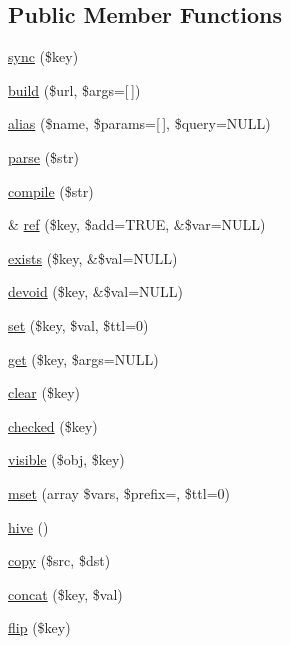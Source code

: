 \subsection*{Public Member Functions}
\begin{DoxyCompactItemize}
\item 
\hyperlink{class_base_aada982ed0466e5ed14d4fcbe22c61840}{sync} (\$key)
\item 
\hyperlink{class_base_a9f2a5290b60008d473e1c9e38f1465d0}{build} (\$url, \$args=\mbox{[}$\,$\mbox{]})
\item 
\hyperlink{class_base_a222997c88655e69eb1bb3a18147ddc3d}{alias} (\$name, \$params=\mbox{[}$\,$\mbox{]}, \$query=N\+U\+LL)
\item 
\hyperlink{class_base_a4d0e49aacf195439c437277b22a81062}{parse} (\$str)
\item 
\hyperlink{class_base_af206a5f3197cfe2acbbb071ec086b710}{compile} (\$str)
\item 
\& \hyperlink{class_base_aee913b6f1b4e910dc64485c4d8e48b15}{ref} (\$key, \$add=T\+R\+UE, \&\$var=N\+U\+LL)
\item 
\hyperlink{class_base_a28497caad131119319e31168c38713b6}{exists} (\$key, \&\$val=N\+U\+LL)
\item 
\hyperlink{class_base_a7de02315df24d7ef20a0bd441060d6d2}{devoid} (\$key, \&\$val=N\+U\+LL)
\item 
\hyperlink{class_base_a845297666b2c78affb9fa78605ebf93e}{set} (\$key, \$val, \$ttl=0)
\item 
\hyperlink{class_base_a17baee8d5275e5926004818839f9d838}{get} (\$key, \$args=N\+U\+LL)
\item 
\hyperlink{class_base_a10a949ef75de6c82c98ac555f371ba83}{clear} (\$key)
\item 
\hyperlink{class_base_a1e33118c04d4a7df9336e02db8f8d663}{checked} (\$key)
\item 
\hyperlink{class_base_a6cdd645b49b8ec6bd1bebe80074f98fb}{visible} (\$obj, \$key)
\item 
\hyperlink{class_base_aa4d056d44b4c50924926f9d40cdb9bf2}{mset} (array \$vars, \$prefix=\textquotesingle{}\textquotesingle{}, \$ttl=0)
\item 
\hyperlink{class_base_a9492bc2587be1faa2fa7e69d2a89a53e}{hive} ()
\item 
\hyperlink{class_base_a9051a0cda0ec6cae19cbd32e3945f31a}{copy} (\$src, \$dst)
\item 
\hyperlink{class_base_ac750abed7c77c34dab7894d272a2a293}{concat} (\$key, \$val)
\item 
\hyperlink{class_base_a0b0020960192ed3b1d87f4c1a2587373}{flip} (\$key)

\end{DoxyCompactItemize}
